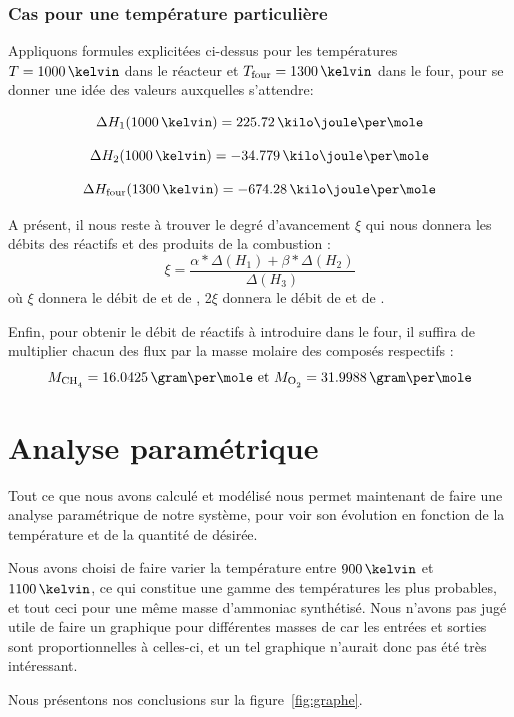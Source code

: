 \documentclass[a4paper,12pt]{article}
\begin{document}
\subsubsection{Cas pour une température particulière}


Appliquons formules explicitées ci-dessus pour les températures $T=1000\,\kelvin$
dans le réacteur et $T\ind{four} = 1300\,\kelvin$ dans le four,
pour se donner une idée des valeurs auxquelles s'attendre:

$$\Delta H_1 (1000\,\kelvin) = 225.72\,\kilo\joule\per\mole$$

$$\Delta H_2 (1000\,\kelvin) = -34.779\,\kilo\joule\per\mole$$

$$\Delta H\ind{four}  (1300\,\kelvin) = -674.28\,\kilo\joule\per\mole$$


A présent, il nous reste à trouver le degré d'avancement $\xi$
qui nous donnera les débits des réactifs et des produits de la combustion :
$$\xi = \frac{\alpha * \Delta (H_1) + \beta * \Delta (H_2)}{\Delta (H_3)}$$
où $\xi$ donnera le débit de  et de ,
2$\xi$ donnera le débit de  et de .


Enfin, pour obtenir le débit de réactifs à introduire dans le four,
il suffira de multiplier chacun des flux par la masse molaire des composés respectifs :
\begin{equation*}
    M_{\ce{CH4}}=16.0425\,\gram\per\mole \mbox{ et } M_{\ce{O2}}=31.9988\,\gram\per\mole
\end{equation*}

\section{Analyse paramétrique}

Tout ce que nous avons calculé et modélisé nous permet maintenant de faire une analyse paramétrique de notre système, pour voir son évolution en fonction de la température et de la quantité de  désirée.

Nous avons choisi de faire varier la température entre $900\,\kelvin$ et $1100\,\kelvin$, ce qui constitue une gamme des températures les plus probables, et tout ceci pour une même masse d'ammoniac synthétisé.
Nous n'avons pas jugé utile de faire un graphique pour différentes masses de  car les entrées et sorties sont proportionnelles à celles-ci, et un tel graphique n'aurait donc pas été très intéressant.

Nous présentons nos conclusions sur la figure~\ref{fig:graphe}.
\end{document}
